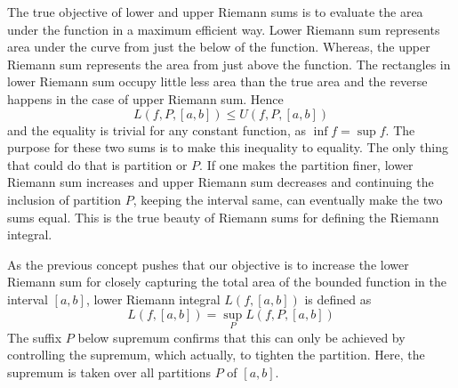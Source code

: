 \begin{concept}
    The true objective of lower and upper Riemann sums is to evaluate the area under the function in a maximum efficient way. Lower Riemann sum represents area under the curve from just the below of the function. Whereas, the upper Riemann sum represents the area from just above the function. The rectangles in lower Riemann sum occupy little less area than the true area and the reverse happens in the case of upper Riemann sum. Hence
    \[
    L(f, P, [a, b])\leq U(f, P, [a,b])
    \]
    and the equality is trivial for any constant function, as $\inf f = \sup f$. The purpose for these two sums is to make this inequality to equality. The only thing that could do that is partition or $P$. If one makes the partition finer, lower Riemann sum increases and upper Riemann sum decreases and continuing the inclusion of partition $P$, keeping the interval same, can eventually make the two sums equal. This is the true beauty of Riemann sums for defining the Riemann integral. 
\end{concept}
\begin{definition}
    As the previous concept pushes that our objective is to increase the lower Riemann sum for closely capturing the total area of the bounded function in the interval $[a, b]$, lower Riemann integral $L(f, [a,b])$ is defined as
    \[
    L(f, [a, b]) = \sup_P L(f, P, [a, b])
    \]
    The suffix $P$ below supremum confirms that this can only be achieved by controlling the supremum, which actually, to tighten the partition. Here, the supremum is taken over all partitions $P$ of $[a, b]$.
\end{definition}

